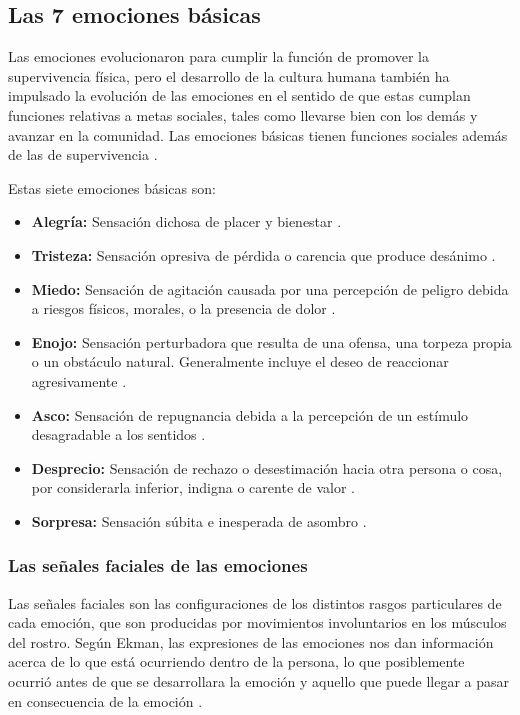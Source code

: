 \subsection*{Las 7 emociones básicas}
Las emociones evolucionaron para cumplir la función de promover la supervivencia física, pero el desarrollo de la cultura humana también ha impulsado la evolución de las emociones en el sentido de que estas cumplan funciones relativas a metas sociales, tales como llevarse bien con los demás y avanzar en la comunidad. Las emociones básicas tienen funciones sociales además de las de supervivencia \cite{rulicki2012cnv}.

Estas siete emociones básicas son:
\begin{itemize}
\item \textbf{Alegría:} Sensación dichosa de placer y bienestar \cite{rulicki2012cnv}.
\item \textbf{Tristeza:} Sensación opresiva de pérdida o carencia que produce desánimo \cite{rulicki2012cnv}.
\item \textbf{Miedo:} Sensación de agitación causada por una percepción de peligro debida a riesgos físicos, morales, o la presencia de dolor \cite{rulicki2012cnv}.
\item \textbf{Enojo:} Sensación perturbadora que resulta de una ofensa, una torpeza propia o un obstáculo natural. Generalmente incluye el deseo de reaccionar agresivamente \cite{rulicki2012cnv}.
\item \textbf{Asco:} Sensación de repugnancia debida a la percepción de un estímulo desagradable a los sentidos \cite{rulicki2012cnv}.
\item \textbf{Desprecio:} Sensación de rechazo o desestimación hacia otra persona o cosa, por considerarla inferior, indigna o carente de valor \cite{rulicki2012cnv}.
\item \textbf{Sorpresa:} Sensación súbita e inesperada de asombro \cite{rulicki2012cnv}.
\end{itemize}

\subsubsection*{Las señales faciales de las emociones}
Las señales faciales son las configuraciones de los distintos rasgos particulares de cada emoción, que son producidas por movimientos involuntarios en los músculos del rostro. Según Ekman, las expresiones de las emociones nos dan información acerca de lo que está ocurriendo dentro de la persona, lo que posiblemente ocurrió antes de que se desarrollara la emoción y aquello que puede llegar a pasar en consecuencia de la emoción \cite{ekman2017rostro}.

